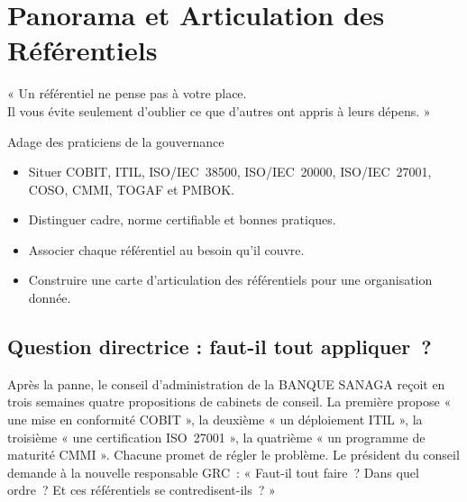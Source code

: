 
\chapter{Panorama et Articulation des Référentiels}
\label{chap:referentiels}

\epigraph{%
    « Un référentiel ne pense pas à votre place.\\
    Il vous évite seulement d'oublier ce que d'autres ont appris à leurs
    dépens. »%
}{Adage des praticiens de la gouvernance}


\begin{boxobjectifs}
\begin{itemize}
    \item Situer COBIT, ITIL, ISO/IEC~38500, ISO/IEC~20000, ISO/IEC~27001,
          COSO, CMMI, TOGAF et PMBOK.
    \item Distinguer cadre, norme certifiable et bonnes pratiques.
    \item Associer chaque référentiel au besoin qu'il couvre.
    \item Construire une carte d'articulation des référentiels pour une
          organisation donnée.
\end{itemize}
\end{boxobjectifs}

\bigskip

\section*{Question directrice : faut-il tout appliquer~?}

Après la panne, le conseil d'administration de la BANQUE SANAGA reçoit en
trois semaines quatre propositions de cabinets de conseil. La première
propose « une mise en conformité COBIT », la deuxième « un déploiement
ITIL », la troisième « une certification ISO~27001 », la quatrième « un
programme de maturité CMMI ». Chacune promet de régler le problème. Le
président du conseil demande à la nouvelle responsable GRC~: « Faut-il
tout faire~? Dans quel ordre~? Et ces référentiels se contredisent-ils~? »

